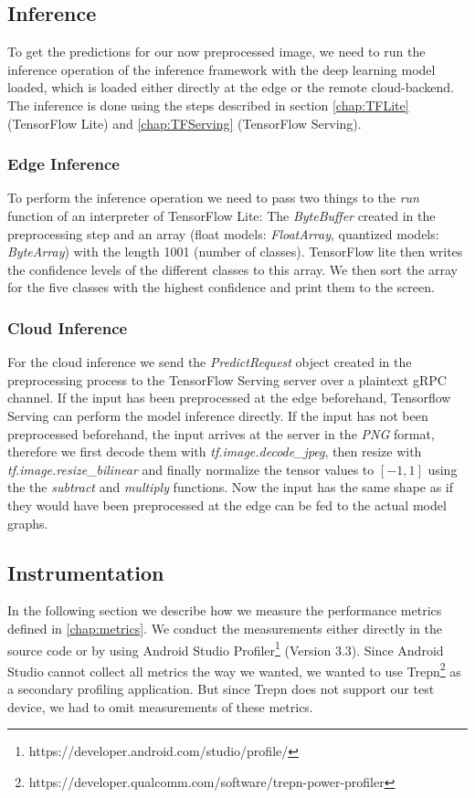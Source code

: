 

\subsection{Inference}
To get the predictions for our now preprocessed image, we need to run the inference operation of the inference framework with the deep learning model loaded, which is loaded either directly at the edge or the remote cloud-backend. 
The inference is done using the steps described in section \ref{chap:TFLite} (TensorFlow Lite) and \ref{chap:TFServing} (TensorFlow Serving).
\subsubsection{Edge Inference}
To perform the inference operation we need to pass two things to the \emph{run} function of an interpreter of TensorFlow Lite: The \emph{ByteBuffer} created in the preprocessing step and an array (float models: \emph{FloatArray}, quantized models: \emph{ByteArray}) with the length 1001 (number of classes). TensorFlow lite then writes the confidence levels of the different classes to this array. We then sort the array for the five classes with the highest confidence and print them to the screen.

\subsubsection{Cloud Inference}
\label{chap:CloudInfImpl}

For the cloud inference we send the \emph{PredictRequest} object created in the preprocessing process to the TensorFlow Serving server over a plaintext gRPC channel.
If the input has been preprocessed at the edge beforehand, Tensorflow Serving can perform the model inference directly.
If the input has not been preprocessed beforehand, the input arrives at the server in the \emph{PNG} format, therefore we first decode them with \emph{tf.image.decode\_jpeg}, then resize with \emph{tf.image.resize\_bilinear} and finally normalize the tensor values to $[-1,1]$ using the the \emph{subtract} and \emph{multiply} functions. Now the input has the same shape as if they would have been preprocessed at the edge can be fed to the actual model graphs.

\subsection{Instrumentation}
\label{chap:insta_measurements}
In the following section we describe how we measure the performance metrics defined in \ref{chap:metrics}.
We conduct the measurements either directly in the source code or by using Android Studio Profiler\footnote{https://developer.android.com/studio/profile/} (Version 3.3). Since Android Studio cannot collect all metrics the way we wanted, we wanted to use Trepn\footnote{https://developer.qualcomm.com/software/trepn-power-profiler} as a secondary profiling application. But since Trepn does not support our test device, we had to omit measurements of these metrics.

